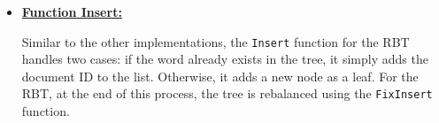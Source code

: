 \begin{itemize}
\begin{itemize}
        \end{itemize}
        \item \underline{\textbf{Function Insert:}} 
        
        Similar to the other implementations, the \texttt{Insert} function for the RBT handles two cases: if the word already exists in the tree, it simply adds the document ID to the list. Otherwise, it adds a new node as a leaf. For the RBT, at the end of this process, the tree is rebalanced using the \texttt{FixInsert} function.
    \end{itemize}        






    

